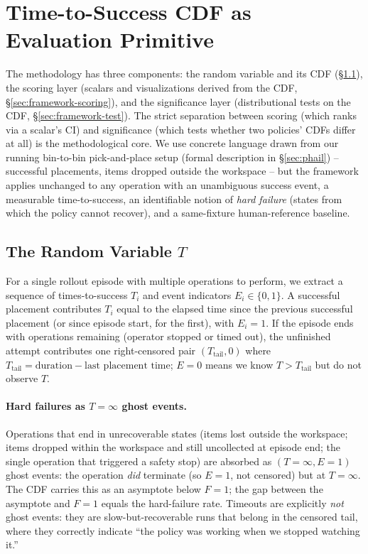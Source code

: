 \documentclass{article}
\begin{document}
\section{Time-to-Success CDF as Evaluation Primitive}\label{sec:framework}

The methodology has three components: the random variable and its CDF (\S\ref{sec:framework-T}), the scoring layer (scalars and visualizations derived from the CDF, \S\ref{sec:framework-scoring}), and the significance layer (distributional tests on the CDF, \S\ref{sec:framework-test}). The strict separation between scoring (which ranks via a scalar's CI) and significance (which tests whether two policies' CDFs differ at all) is the methodological core. We use concrete language drawn from our running bin-to-bin pick-and-place setup (formal description in \S\ref{sec:phail}) -- successful placements, items dropped outside the workspace -- but the framework applies unchanged to any operation with an unambiguous success event, a measurable time-to-success, an identifiable notion of \emph{hard failure} (states from which the policy cannot recover), and a same-fixture human-reference baseline.

\subsection{The Random Variable $T$}\label{sec:framework-T}

For a single rollout episode with multiple operations to perform, we extract a sequence of times-to-success $T_i$ and event indicators $E_i \in \{0, 1\}$. A successful placement contributes $T_i$ equal to the elapsed time since the previous successful placement (or since episode start, for the first), with $E_i = 1$. If the episode ends with operations remaining (operator stopped or timed out), the unfinished attempt contributes one right-censored pair $(T_{\text{tail}}, 0)$ where $T_{\text{tail}} = \text{duration} - \text{last placement time}$; $E = 0$ means we know $T > T_{\text{tail}}$ but do not observe $T$.

\paragraph{Hard failures as $T = \infty$ ghost events.} Operations that end in unrecoverable states (items lost outside the workspace; items dropped within the workspace and still uncollected at episode end; the single operation that triggered a safety stop) are absorbed as $(T = \infty, E = 1)$ ghost events: the operation \emph{did} terminate (so $E = 1$, not censored) but at $T = \infty$. The CDF carries this as an asymptote below $F = 1$; the gap between the asymptote and $F = 1$ equals the hard-failure rate. Timeouts are explicitly \emph{not} ghost events: they are slow-but-recoverable runs that belong in the censored tail, where they correctly indicate ``the policy was working when we stopped watching it.''
\end{document}

